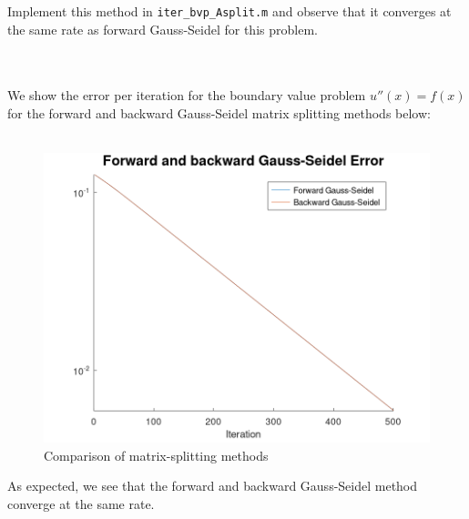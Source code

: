 Implement this method in \texttt{iter\_bvp\_Asplit.m} and observe that it converges at the same rate as forward 
Gauss-Seidel for this problem.

\begin{solution}\ \\\\
    We show the error per iteration for the boundary value problem $u''(x) = f(x)$ for the forward and backward
    Gauss-Seidel matrix splitting methods below: \\\\

    \begin{figure}[h]
        \centering
        \includegraphics[width=.7\textwidth]{problem_2b_forward_backward_gs_error_500_iterations.png}
        \caption[]{Comparison of matrix-splitting methods}
    \end{figure}

    As expected, we see that the forward and backward Gauss-Seidel method converge at the same rate.
    \ \\\\
\end{solution}
